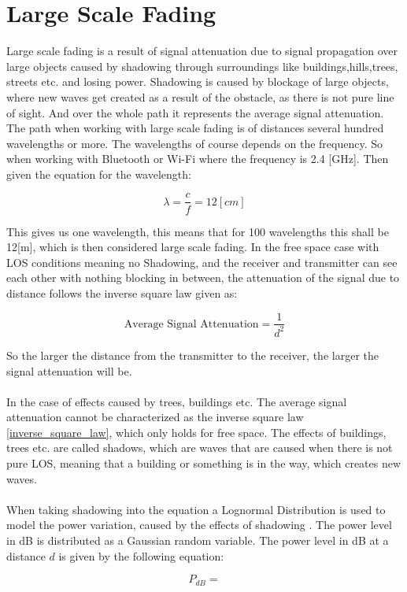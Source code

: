 \chapter{Large Scale Fading}

Large scale fading \citep{large_scale_fade} \citep{large_scale_fade2} is a result of signal attenuation due to signal propagation over large objects caused by shadowing through surroundings like buildings,hills,trees, streets etc. and losing power. Shadowing is caused by blockage of large objects, where new waves get created as a result of the obstacle, as there is not pure line of sight. And over the whole path it represents the average signal attenuation. The path when working with large scale fading is of distances several hundred wavelengths or more. The wavelengths of course depends on the frequency. So when working with Bluetooth or Wi-Fi where the frequency is 2.4 [GHz]. 
Then given the equation for the wavelength:

\begin{equation}
\lambda = \frac{c}{f} = 12 [cm] 
\end{equation}

This gives us one wavelength, this means that for 100 wavelengths this shall be 12[m], which is then considered large scale fading. In the free space case with LOS conditions meaning no Shadowing, and the receiver and transmitter can see each other with nothing blocking in between, the attenuation of the signal due to distance follows the inverse square law given as:

\begin{equation}
\text{Average Signal Attenuation} = \frac{1}{d^{2}}
\label{inverse_square_law}
\end{equation}  

So the larger the distance from the transmitter to the receiver, the larger the signal attenuation will be. 
\\
\\
In the case of effects caused by trees, buildings etc. The average signal attenuation cannot be characterized as the inverse square law \ref{inverse_square_law}, which only holds for free space. The effects of buildings, trees etc. are called shadows, which are waves that are caused when there is not pure LOS, meaning that a building or something is in the way, which creates new waves.
\\
\\
When taking shadowing into the equation a Lognormal Distribution is used to model the power variation, caused by the effects of shadowing \citep{large_scale_fade3}. The power level in dB is distributed as a Gaussian random variable. The power level in dB at a distance $d$ is given by the following equation:

\begin{equation}
P_{dB} = 
\label{power_level}
\end{equation}     


